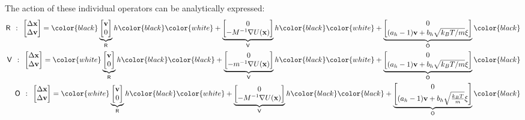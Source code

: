 \documentclass[aip,jcp,preprint,superscriptaddress,floatfix]{revtex4-1}
\newcommand{\x}{\mathbf{x}}
\newcommand{\vel}{\mathbf{v}}
\newcommand{\splitting}[1]{{\bf \sf #1}} %
\newcommand{\substep}{h} %
\begin{document}
The action of these individual operators can be analytically expressed:
\begin{eqnarray}
\splitting{R} \:\: : \:\: \begin{bmatrix} \Delta\x\\ \Delta\vel \end{bmatrix} =
\color{black} \underbrace{\begin{bmatrix} \vel \\ 0 \end{bmatrix}}_\splitting{R} \substep \color{black}
\color{white} + \underbrace{\begin{bmatrix} 0 \\ - M^{-1} \nabla U(\x) \end{bmatrix}}_\splitting{V} \substep \color{black}
\color{white} + \underbrace{\begin{bmatrix} 0 \\ (a_{h} - 1) \vel + b_{h} \sqrt{k_B T / m} \xi \end{bmatrix}}_\splitting{O} \color{black} \\
\splitting{V} \:\: : \:\: \begin{bmatrix} \Delta\x\\ \Delta\vel \end{bmatrix} =
\color{white} \underbrace{\begin{bmatrix} \vel \\ 0 \end{bmatrix}}_\splitting{R} \substep \color{black}
\color{black} + \underbrace{\begin{bmatrix} 0 \\ - m^{-1} \nabla U(\x) \end{bmatrix}}_\splitting{V} \substep \color{black}
\color{white} + \underbrace{\begin{bmatrix} 0 \\ (a_{h} - 1) \vel + b_{h} \sqrt{k_B T / m} \xi \end{bmatrix}}_\splitting{O} \color{black} \\
\splitting{O} \:\: : \:\: \begin{bmatrix} \Delta\x\\ \Delta\vel \end{bmatrix} =
\color{white} \underbrace{\begin{bmatrix} \vel \\ 0 \end{bmatrix}}_\splitting{R} \substep \color{black}
\color{white} + \underbrace{\begin{bmatrix} 0 \\ - M^{-1} \nabla U(\x) \end{bmatrix}}_\splitting{V} \substep \color{black}
\color{black} + \underbrace{\begin{bmatrix} 0 \\ (a_{h} - 1) \vel + b_{h} \sqrt{\frac{k_B T}{m}} \xi \end{bmatrix}}_\splitting{O} \color{black}
\end{eqnarray}
\end{document}
